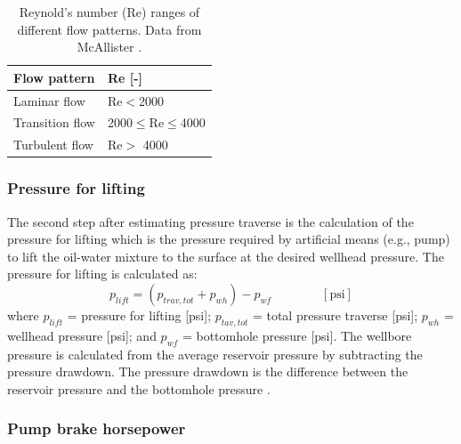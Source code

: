 \documentclass[11pt]{report}
\newcommand{\eqnunit}[1]{\quad\quad \scriptstyle{\left[\text{#1}\right]}}
\begin{document}
\begin{table}
\begin{scriptsize}
\caption{Reynold's number (Re) ranges of different flow patterns. Data from McAllister \cite{Mcallister2009}.}
\label{tab:NRe_ranges}
\begin{tabular*}{0.75\columnwidth}{p{}p{}}
\toprule
Flow pattern & Re [-] \\
\midrule
Laminar flow & Re$<$2000 \\
Transition flow & 2000$\leq$Re$\leq$4000 \\
Turbulent flow & Re$>$ 4000 \\
\bottomrule
\end{tabular*}
\end{scriptsize}
\end{table}



\subsubsection{Pressure for lifting}

The second step after estimating pressure traverse is the calculation of the pressure for lifting which is the pressure required by artificial means (e.g., pump) to lift the oil-water mixture to the surface at the desired wellhead pressure. The pressure for lifting is calculated as:
\begin{equation} \label{eq:pressure_lifting}
p_{lift}=(p_{trav,tot}+p_{wh})-p_{wf} \quad\quad\eqnunit{psi}
\end{equation}
where $p_{lift}$ = pressure for lifting [\unit{psi}]; $p_{tav,tot}$ = total pressure traverse [\unit{psi}]; $p_{wh}$ = wellhead pressure [\unit{psi}]; and $p_{wf}$ = bottomhole pressure [\unit{psi}]. The wellbore pressure is calculated from the average reservoir pressure by subtracting the pressure drawdown. The pressure drawdown is the difference between the reservoir pressure and the bottomhole pressure \cite[p. 22]{Takacs2005}.

\subsubsection{Pump brake horsepower}
\end{document}
